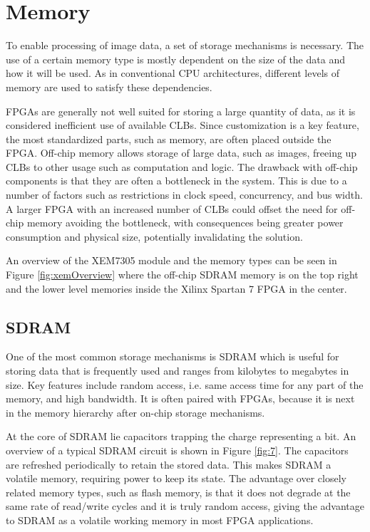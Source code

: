 \documentclass[12pt]{report}
\begin{document}
\section{Memory}
To enable processing of image data, a set of storage mechanisms is necessary. The use of a certain memory type is mostly dependent on the size of the data and how it will be used. As in conventional CPU architectures, different levels of memory are used to satisfy these dependencies.
\par
FPGAs are generally not well suited for storing a large quantity of data, as it is considered inefficient use of available CLBs. Since customization is a key feature, the most standardized parts, such as memory, are often placed outside the FPGA. Off-chip memory allows storage of large data, such as images, freeing up CLBs to other usage such as computation and logic. The drawback with off-chip components is that they are often a bottleneck in the system. This is due to a number of factors such as restrictions in clock speed, concurrency, and bus width. A larger FPGA with an increased number of CLBs could offset the need for off-chip memory avoiding the bottleneck, with consequences being greater power consumption and physical size, potentially invalidating the solution.
\par
An overview of the XEM7305 module and the memory types can be seen in Figure \ref{fig:xemOverview} where the off-chip SDRAM memory is on the top right and the lower level memories inside the Xilinx Spartan 7 FPGA in the center.

\subsection{SDRAM}
One of the most common storage mechanisms is SDRAM which is useful for storing data that is frequently used and ranges from kilobytes to megabytes in size. Key features include random access, i.e. same access time for any part of the memory, and high bandwidth. It is often paired with FPGAs, because it is next in the memory hierarchy after on-chip storage mechanisms.
\par
At the core of SDRAM lie capacitors trapping the charge representing a bit. An overview of a typical SDRAM circuit is shown in Figure \ref{fig:7}. The capacitors are refreshed periodically to retain the stored data. This makes SDRAM a volatile memory, requiring power to keep its state. The advantage over closely related memory types, such as flash memory, is that it does not degrade at the same rate of read/write cycles and it is truly random access, giving the advantage to SDRAM as a volatile working memory in most FPGA applications. \citep{SDRAMFLASH} \citep{NANDNORFlash}
\end{document}

